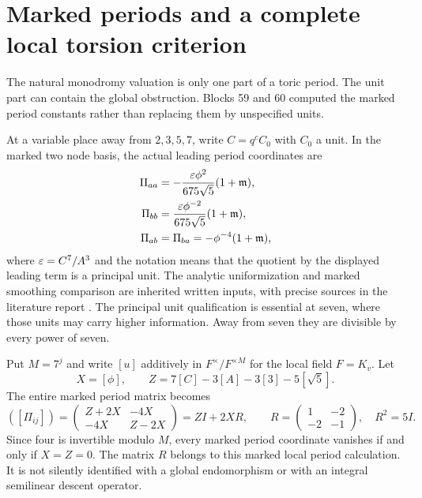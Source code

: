 \section{Marked periods and a complete local torsion criterion}\label{sec:periods}
The natural monodromy valuation is only one part of a toric period. The unit part can contain the global obstruction. Blocks 59 and 60 computed the marked period constants rather than replacing them by unspecified units.

At a variable place away from $2,3,5,7$, write $C=q^cC_0$ with $C_0$ a unit. In the marked two node basis, the actual leading period coordinates are
\begin{align*}
\Pi_{aa}&=-\frac{\varepsilon\phi^2}{675\sqrt5}(1+\mathfrak m),\\
\Pi_{bb}&=\frac{\varepsilon\phi^{-2}}{675\sqrt5}(1+\mathfrak m),\\
\Pi_{ab}&=\Pi_{ba}=-\phi^{-4}(1+\mathfrak m),
\end{align*}
where $\varepsilon=C^7/A^3$ and the notation means that the quotient by the displayed leading term is a principal unit. The analytic uniformization and marked smoothing comparison are inherited written inputs, with precise sources in the literature report \cite{mumford1972,ichikawa1993}. The principal unit qualification is essential at seven, where those units may carry higher information. Away from seven they are divisible by every power of seven.

Put $M=7^j$ and write $[u]$ additively in $F^\times/F^{\times M}$ for the local field $F=K_v$. Let
\[
X=[\phi],\qquad Z=7[C]-3[A]-3[3]-5[\sqrt5].
\]
The entire marked period matrix becomes
\begin{equation}\label{eq:periodmatrix}
([\Pi_{ij}])=
\begin{pmatrix}Z+2X&-4X\\-4X&Z-2X\end{pmatrix}
=ZI+2XR,\qquad R=\begin{pmatrix}1&-2\\-2&-1\end{pmatrix},\quad R^2=5I.
\end{equation}
Since four is invertible modulo $M$, every marked period coordinate vanishes if and only if $X=Z=0$. The matrix $R$ belongs to this marked local period calculation. It is not silently identified with a global endomorphism or with an integral semilinear descent operator.

